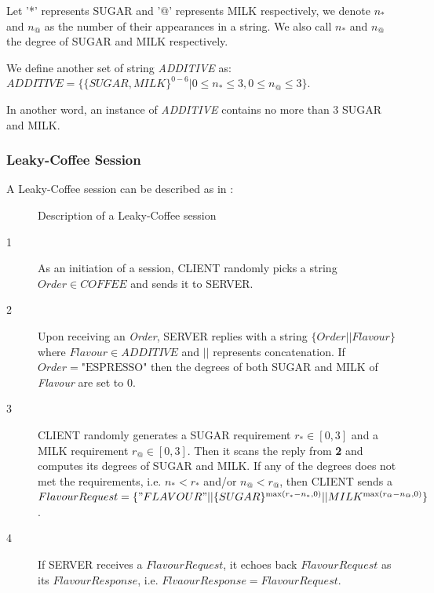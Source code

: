 \begin{definition}
Let '*' represents SUGAR and '@' represents MILK respectively, we denote $n_*$ and $n_@$ as the number of their appearances in a string. We also call $n_*$ and $n_@$ the degree of SUGAR and MILK respectively.
\end{definition}

\begin{definition}
We define another set of string \textit{ADDITIVE} as:\\
$ADDITIVE = \{\{ SUGAR, MILK \}^{0 - 6} | 0 \leq n_{*} \leq 3, 0 \leq n_{@} \leq 3 \}$.

In another word, an instance of \textit{ADDITIVE} contains no more than 3 SUGAR and MILK.
\end{definition}

\subsubsection{Leaky-Coffee Session}
A Leaky-Coffee session can be described as in :

\begin{figure}[H]
\centering
\resizebox{10cm}{!}
{}
\caption{Description of a Leaky-Coffee session}
\label{Fig: Leaky-Coffee Session}
\end{figure}

\begin{description}
\item[1] As an initiation of a session, CLIENT randomly picks a string $Order \in COFFEE$ and sends it to SERVER.

\item[2] Upon receiving an \textit{Order}, SERVER replies with a string $\{Order || Flavour\}$ where $Flavour \in ADDITIVE$ and $||$ represents concatenation. If $Order = \text{"ESPRESSO"}$ then the degrees of both SUGAR and MILK of \textit{Flavour} are set to $0$\label{ESPRESSO}.

\item[3] CLIENT randomly generates a SUGAR requirement $r_* \in [0, 3]$ and a MILK requirement $r_@ \in [0,3]$. Then it scans the reply from \textbf{2} and computes its degrees of SUGAR and MILK. If any of the degrees does not  met the requirements, i.e. $n_* < r_*$ and/or $n_@ < r_@$, then CLIENT sends a $ FlavourRequest = \{"FLAVOUR"||\{SUGAR\}^{\max({r_* - n_*,0})} || MILK^{\max(r_@ -  n_@, 0)} \} $.

\item[4] If SERVER receives a $FlavourRequest$, it echoes back $FlavourRequest$ as its $FlavourResponse$, i.e. $FlvaourResponse = FlavourRequest$.	
\end{description}

